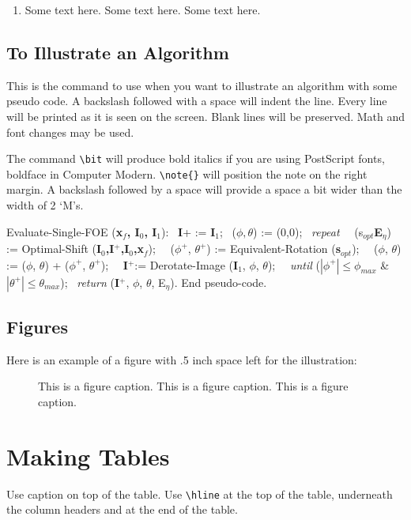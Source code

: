 \begin{article}
\begin{enumerate}
\begin{enumerate}
\begin{enumerate}
\item
Some text here. Some text here. Some text here.
\end{enumerate}
\end{enumerate}
\end{enumerate}


\subsection{To Illustrate an Algorithm}
This is the command to use when you want to illustrate an algorithm
with some pseudo code. A backslash followed with a space will
indent the line. Every line will be printed
as it is seen on the screen. Blank lines will be preserved.
Math and font changes may be used. 

The command
\verb+\bit+ will produce bold italics if you are using PostScript fonts, 
boldface in Computer Modern. \verb+\note{}+ will position the
note on the right margin. A backslash followed by a space
will provide a space a bit wider than the width of 2 `M's.

\begin{algorithm}
{\bit Evaluate-Single-FOE} ({\bf x$_f$, I$_0$, I$_1$}):
\ {\bf I}+ := {\bf I}$_1$;
\ ($\phi,\theta$) := (0,0);
\ {\it repeat}
\ \ (s$_{opt}${\bf E}$_\eta$) := {\bit Optimal-Shift} ({\bf I$_0$,I$^+$,I$_0$,x$_f$});
\ \ ($\phi^+$, $\theta^+$) := {\bit Equivalent-Rotation} ({\bf s}$_{opt}$);
\ \ ($\phi$, $\theta$) := ($\phi$, $\theta$) + ($\phi^+$, $\theta^+$);
\ \ {\bf I}$^+$:= {\bit Derotate-Image} ({\bf I}$_1$, $\phi$, $\theta$);
\ \ {\it until} ($|\phi^+|\leq\phi_{max}$ \& $|\theta^+|\leq\theta_{max}$);
\ {\it return} ({\bf I}$^+$, $\phi$, $\theta$, E$_\eta$).
End pseudo-code.
\end{algorithm}

\newpage
\subsection{Figures}
Here is an example of a figure with .5 inch space left for
the illustration:
\begin{figure}[h]
\vspace*{.5in}
\caption{This is a figure caption.
This is a figure caption.
This is a figure caption.}
\end{figure}

\section{Making Tables}
Use caption on top of the table. 
Use \verb+\hline+ at the top of the table, underneath the column headers
and at the end of the table.


\end{article}
